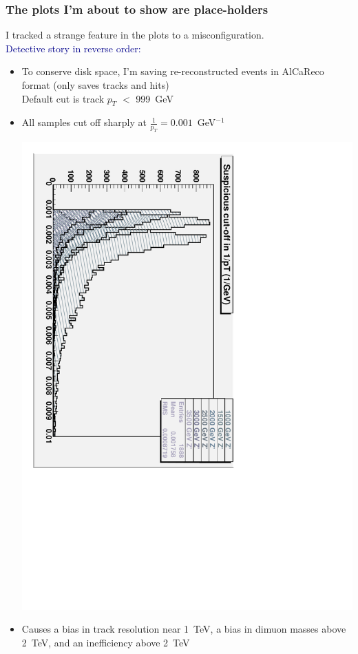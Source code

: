 \documentclass[compress]{beamer}
\begin{document}
\begin{frame}
\frametitle{The plots I'm about to show are place-holders}

I tracked a strange feature in the plots to a misconfiguration.  \\
\textcolor{darkblue}{Detective story in reverse order:}
\begin{itemize}\setlength{\itemsep}{0.25 cm}
\item To conserve disk space, I'm saving re-reconstructed events in
AlCaReco format (only saves tracks and hits) \\ Default cut is track $p_T$ $<$ 999~GeV

\item \begin{minipage}{0.45\linewidth}All samples cut off sharply at $\frac{1}{p_T} = 0.001$~GeV$^{-1}$\end{minipage} \hfill \begin{minipage}{0.5\linewidth}\includegraphics[height=\linewidth, angle=90]{suspicious.pdf}\end{minipage}

\item Causes a bias in track resolution near 1~TeV, a bias in dimuon masses above 2~TeV, and an inefficiency above 2~TeV
\end{itemize}
\end{frame}
\end{document}
